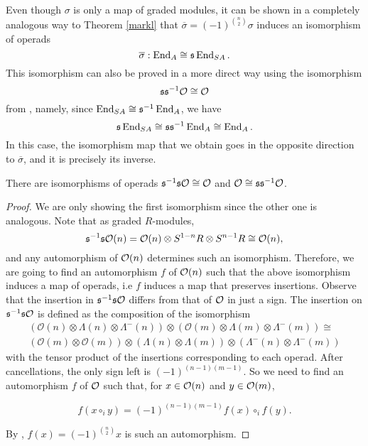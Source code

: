 \documentclass[Thesis.tex]{subfiles}
\begin{document}
Even though $\sigma$ is only a map of graded modules, it can be shown in a completely analogous way to Theorem \ref{markl} that $\overline{\sigma}=(-1)^{\binom{n}{2}}\sigma$ induces an isomorphism of operads
\begin{equation}\label{barsigma}
\overline{\sigma}:\operatorname{End}_{A}\cong\mathfrak{s}\operatorname{End}_{SA}.
\end{equation}
This isomorphism can also be proved in a more direct way using the isomorphism \[\mathfrak{s}\mathfrak{s}^{-1}{\mathcal O}\cong{\mathcal O}\] from , namely, since $\operatorname{End}_{SA}\cong \mathfrak{s}^{-1}\operatorname{End}_A$, we have \[\mathfrak{s}\operatorname{End}_{SA}\cong \mathfrak{s}\mathfrak{s}^{-1}\operatorname{End}_A\cong \operatorname{End}_A.\]
In this case, the isomorphism map that we obtain goes in the opposite direction to $\overline{\sigma}$, and it is precisely its inverse.


\begin{lem}\label{suspiso}
There are isomorphisms of operads $\mathfrak{s}^{-1}\mathfrak{s}{\mathcal O}\cong{\mathcal O}$ and ${\mathcal O}\cong\mathfrak{s}\mathfrak{s}^{-1}{\mathcal O}$.
\end{lem}
\begin{proof}
We are only showing the first isomorphism since the other one is analogous. Note that as graded $R$-modules, \[\mathfrak{s}^{-1}\mathfrak{s}{\mathcal O}(n)= {\mathcal O}(n)\otimes S^{1-n}R\otimes S^{n-1}R\cong{\mathcal O}(n),\] 
and any automorphism of ${\mathcal O}(n)$ determines such an isomorphism. Therefore, we are going to find an automorphism $f$ of ${\mathcal O}(n)$ such that the above isomorphism induces a map of operads, i.e $f$ induces a map that preserves insertions. Observe that the insertion in $\mathfrak{s}^{-1}\mathfrak{s}{\mathcal O}$ differs from that of ${\mathcal O}$ in just a sign. The insertion on $\mathfrak{s}^{-1}\mathfrak{s}{\mathcal O}$ is defined as the composition of the isomorphism
\begin{align*}
(\mathcal{O}(n)\otimes \Lambda(n)\otimes \Lambda^-(n))\otimes (\mathcal{O}(m)\otimes \Lambda(m)\otimes \Lambda^-(m))\cong\\ (\mathcal{O}(m)\otimes \mathcal{O}(m))\otimes (\Lambda(n)\otimes \Lambda(m))\otimes (\Lambda^-(n)\otimes \Lambda^-(m))
\end{align*}
with the tensor product of the insertions corresponding to each operad. After cancellations, the only sign left is $(-1)^{(n-1)(m-1)}$. So we need to find an automorphism $f$ of ${\mathcal O}$ such that, for $x\in{\mathcal O}(n)$ and $y\in{\mathcal O}(m)$,

\[f(x\circ_i y)=(-1)^{(n-1)(m-1)}f(x)\circ_i f(y).\]

By , $f(x)=(-1)^{\binom{n}{2}}x$ is such an automorphism.
\end{proof}
\end{document}
